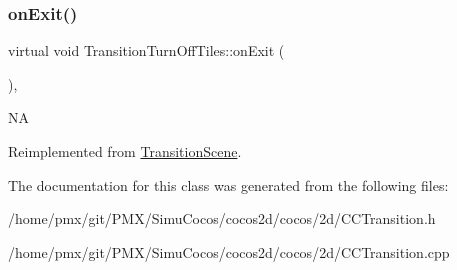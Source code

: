 \subsubsection{\texorpdfstring{on\+Exit()}{onExit()}\hspace{0.1cm}{\footnotesize\ttfamily [2/2]}}
{\footnotesize\ttfamily virtual void Transition\+Turn\+Off\+Tiles\+::on\+Exit (\begin{DoxyParamCaption}{ }\end{DoxyParamCaption})\hspace{0.3cm}{\ttfamily [override]}, {\ttfamily [virtual]}}

NA 

Reimplemented from \hyperlink{classTransitionScene_a45e39b658189c79428a05c3bc3173bbb}{Transition\+Scene}.



The documentation for this class was generated from the following files\+:\begin{DoxyCompactItemize}
\item 
/home/pmx/git/\+P\+M\+X/\+Simu\+Cocos/cocos2d/cocos/2d/C\+C\+Transition.\+h\item 
/home/pmx/git/\+P\+M\+X/\+Simu\+Cocos/cocos2d/cocos/2d/C\+C\+Transition.\+cpp\end{DoxyCompactItemize}
